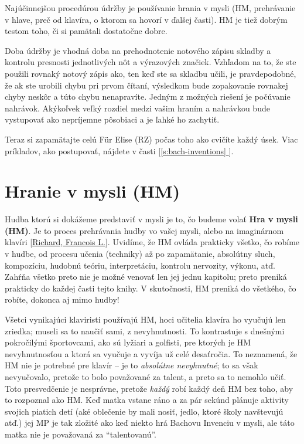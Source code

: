 \documentclass[11pt,a4paper]{book}
\newcommand*{\fullref}[1]{\hyperref[{#1}]{\ref*{#1} \nameref*{#1}}} %
\newcommand*{\fullrefp}[1]{[\fullref{#1}]} %
\begin{document}
Najúčinnejšou procedúrou údržby je používanie hrania v mysli (HM, prehrávanie v hlave, preč od klavíra, o ktorom sa hovorí v ďalšej časti). HM je tiež dobrým testom toho, či si pamätali dostatočne dobre.

Doba údržby je vhodná doba na prehodnotenie notového zápisu skladby a kontrolu presnosti jednotlivých nôt a výrazových značiek. Vzhľadom na to, že ste použili rovnaký notový zápis ako, ten keď ste sa skladbu učili, je pravdepodobné, že ak ste urobili chybu pri prvom čítaní, výsledkom bude zopakovanie rovnakej chyby neskôr a túto chybu nenapravíte. Jedným z možných riešení je počúvanie nahrávok. Akýkoľvek veľký rozdiel medzi vašim hraním a nahrávkou bude vystupovať ako nepríjemne pôsobiaci a je ľahké ho zachytiť.
	
Teraz si zapamätajte celú Für Elise (RZ) počas toho ako cvičíte každý úsek. Viac príkladov, ako postupovať, nájdete v časti \fullrefp{s:bach-inventions}.

\section{Hranie v mysli (HM)}\label{s:mental-play}
Hudba ktorú si dokážeme predstaviť v mysli je to, čo budeme volať \textbf{Hra v mysli (HM)}. Je to proces prehrávania hudby vo vašej mysli, alebo na imaginárnom klavíri {[}\hyperlink{r:prokop}{Richard, Francois L.}{]}. Uvidíme, že HM ovláda prakticky všetko, čo robíme v hudbe, od procesu učenia (techniky) až po zapamätanie, absolútny sluch, kompozíciu, hudobnú teóriu, interpretáciu, kontrolu nervozity, výkonu, atď. Zahŕňa všetko preto nie je možné venovať len jej jednu kapitolu; preto preniká prakticky do každej časti tejto knihy. V skutočnosti, HM preniká do všetkého, čo robíte, dokonca aj mimo hudby!

Všetci vynikajúci klaviristi používajú HM, hoci učitelia klavíra ho vyučujú len zriedka; museli sa to naučiť sami, z nevyhnutnosti. To kontrastuje s dnešnými pokročilými športovcami, ako sú lyžiari a golfisti, pre ktorých je HM nevyhnutnosťou a ktorá sa vyučuje a vyvíja už celé desaťročia. To neznamená, že HM nie je potrebné pre klavír – je to \emph{absolútne nevyhnutné}; to sa však nevyučovalo, pretože to bolo považované za talent, a preto sa to nemohlo učiť. Toto presvedčenie je nesprávne, pretože \emph{každý} robí každý deň HM bez toho, aby to rozpoznal ako HM. Keď matka vstane ráno a za pár sekúnd plánuje aktivity svojich piatich detí (aké oblečenie by mali nosiť, jedlo, ktoré školy navštevujú atď.) jej MP je tak zložité ako keď niekto hrá Bachovu Invenciu v mysli, ale táto matka nie je považovaná za “talentovanú”.
\end{document}
